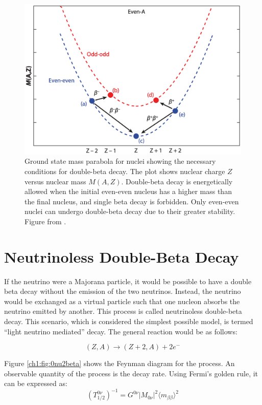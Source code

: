 \begin{figure}[!htb]
\centering
\includegraphics[width=0.8\linewidth]{ch1/figs/2nbb_cond.png}
\caption{Ground state mass parabola for nuclei showing the necessary conditions for double-beta decay. The plot shows nuclear charge \(Z\) versus nuclear mass \(M(A,Z)\). Double-beta decay is energetically allowed when the initial even-even nucleus has a higher mass than the final nucleus, and single beta decay is forbidden. Only even-even nuclei can undergo double-beta decay due to their greater stability. Figure from \cite{2nbb_cond}.}
\label{2nbb_cond}

\end{figure}

\section{Neutrinoless Double-Beta Decay}
If the neutrino were a Majorana particle, it would be possible to have a double beta decay without the emission of the two neutrinos. Instead, the neutrino would be exchanged as a virtual particle such that one nucleon absorbs the neutrino emitted by another. This process is called neutrinoless double-beta decay. This scenario, which is considered the simplest possible model, is termed ``light neutrino mediated'' decay. The general reaction would be as follows:

\begin{equation}\label{0nbeta_decay_eq}
(Z,A) \rightarrow (Z+2,A) + 2e^-
\end{equation}




Figure \ref{ch1:fig:0nu2beta} shows the Feynman diagram for the process. An observable quantity of the process is the decay rate. Using Fermi's golden rule, it can be expressed as:
\begin{equation}\label{0nbbdecay_rate}
(T^{0\nu}_{1/2})^{-1} = G^{0\nu}\left|M_{0\nu}\right|^2\langle m_{\beta\beta}\rangle^2
\end{equation}

